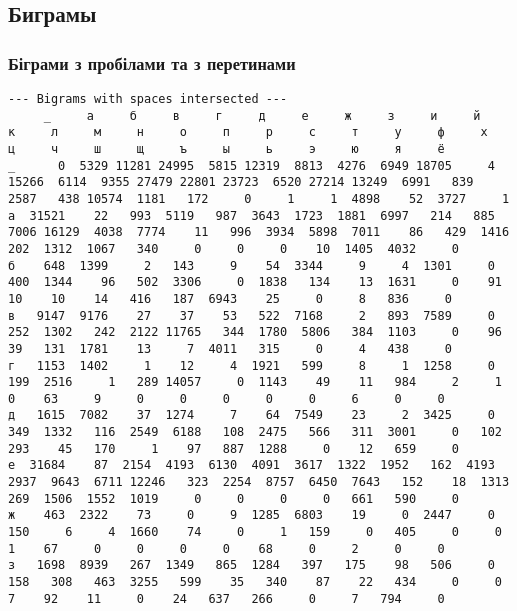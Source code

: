 \documentclass{article}
\begin{document}
\begin{landscape}
	\newpage
	\subsection{Биграмы}
	\tiny
	
	\vspace{-1em}
	\subsubsection{Біграми з пробілами та з перетинами}
	\begin{addmargin}{0em}
		\begin{verbatim}
--- Bigrams with spaces intersected ---
     _     а     б     в     г     д     е     ж     з     и     й     к     л     м     н     о     п     р     с     т     у     ф     х     ц     ч     ш     щ     ъ     ы     ь     э     ю     я     ё    
_      0  5329 11281 24995  5815 12319  8813  4276  6949 18705     4 15266  6114  9355 27479 22801 23723  6520 27214 13249  6991   839  2587   438 10574  1181   172     0     1     1  4898    52  3727     1
а  31521    22   993  5119   987  3643  1723  1881  6997   214   885  7006 16129  4038  7774    11   996  3934  5898  7011    86   429  1416   202  1312  1067   340     0     0     0    10  1405  4032     0
б    648  1399     2   143     9    54  3344     9     4  1301     0   400  1344    96   502  3306     0  1838   134    13  1631     0    91    10    10    14   416   187  6943    25     0     8   836     0
в   9147  9176    27    37    53   522  7168     2   893  7589     0   252  1302   242  2122 11765   344  1780  5806   384  1103     0    96    39   131  1781    13     7  4011   315     0     4   438     0
г   1153  1402     1    12     4  1921   599     8     1  1258     0   199  2516     1   289 14057     0  1143    49    11   984     2     1     0    63     9     0     0     0     0     0     6     0     0
д   1615  7082    37  1274     7    64  7549    23     2  3425     0   349  1332   116  2549  6188   108  2475   566   311  3001     0   102   293    45   170     1    97   887  1288     0    12   659     0
е  31684    87  2154  4193  6130  4091  3617  1322  1952   162  4193  2937  9643  6711 12246   323  2254  8757  6450  7643   152    18  1313   269  1506  1552  1019     0     0     0     0   661   590     0
ж    463  2322    73     0     9  1285  6803    19     0  2447     0   150     6     4  1660    74     0     1   159     0   405     0     0     1    67     0     0     0     0    68     0     2     0     0
з   1698  8939   267  1349   865  1284   397   175    98   506     0   158   308   463  3255   599    35   340    87    22   434     0     0     7    92    11     0    24   637   266     0     7   794     0

\end{verbatim}
\end{addmargin}
\end{landscape}
\end{document}

